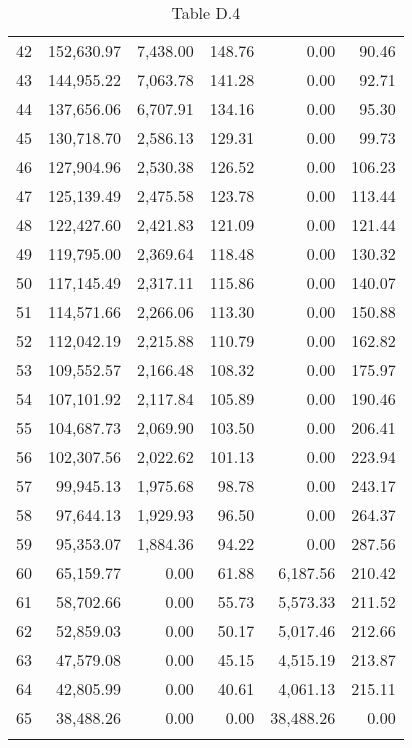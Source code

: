 \documentclass[12pt]{article}
\begin{document}
\begin{longtable}{rrrrrr}
  42 & 152,630.97 & 7,438.00 & 148.76 & 0.00 & 90.46 \\ 
  43 & 144,955.22 & 7,063.78 & 141.28 & 0.00 & 92.71 \\ 
  44 & 137,656.06 & 6,707.91 & 134.16 & 0.00 & 95.30 \\ 
  45 & 130,718.70 & 2,586.13 & 129.31 & 0.00 & 99.73 \\ 
  46 & 127,904.96 & 2,530.38 & 126.52 & 0.00 & 106.23 \\ 
  47 & 125,139.49 & 2,475.58 & 123.78 & 0.00 & 113.44 \\ 
  48 & 122,427.60 & 2,421.83 & 121.09 & 0.00 & 121.44 \\ 
  49 & 119,795.00 & 2,369.64 & 118.48 & 0.00 & 130.32 \\ 
  50 & 117,145.49 & 2,317.11 & 115.86 & 0.00 & 140.07 \\ 
  51 & 114,571.66 & 2,266.06 & 113.30 & 0.00 & 150.88 \\ 
  52 & 112,042.19 & 2,215.88 & 110.79 & 0.00 & 162.82 \\ 
  53 & 109,552.57 & 2,166.48 & 108.32 & 0.00 & 175.97 \\ 
  54 & 107,101.92 & 2,117.84 & 105.89 & 0.00 & 190.46 \\ 
  55 & 104,687.73 & 2,069.90 & 103.50 & 0.00 & 206.41 \\ 
  56 & 102,307.56 & 2,022.62 & 101.13 & 0.00 & 223.94 \\ 
  57 & 99,945.13 & 1,975.68 & 98.78 & 0.00 & 243.17 \\ 
  58 & 97,644.13 & 1,929.93 & 96.50 & 0.00 & 264.37 \\ 
  59 & 95,353.07 & 1,884.36 & 94.22 & 0.00 & 287.56 \\ 
  60 & 65,159.77 & 0.00 & 61.88 & 6,187.56 & 210.42 \\ 
  61 & 58,702.66 & 0.00 & 55.73 & 5,573.33 & 211.52 \\ 
  62 & 52,859.03 & 0.00 & 50.17 & 5,017.46 & 212.66 \\ 
  63 & 47,579.08 & 0.00 & 45.15 & 4,515.19 & 213.87 \\ 
  64 & 42,805.99 & 0.00 & 40.61 & 4,061.13 & 215.11 \\ 
  65 & 38,488.26 & 0.00 & 0.00 & 38,488.26 & 0.00 \\ 
  \hline
\caption{Table D.4} 
\end{longtable}
\end{document}
